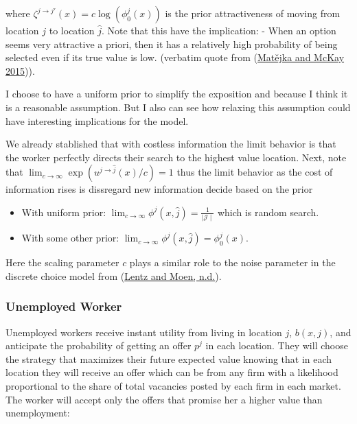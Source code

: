 \documentclass[
  letterpaper,
  DIV=11,
  numbers=noendperiod]{scrartcl}
\providecommand{\tightlist}{%
  \setlength{\itemsep}{0pt}\setlength{\parskip}{0pt}}\usepackage{longtable,booktabs,array}
\begin{document}
where \(\zeta^{j \to j'}(x) = c \log(\phi^j_0(x))\) is the prior
attractiveness of moving from location \(j\) to location \(\hat{j}\).
Note that this have the implication: - When an option seems very
attractive a priori, then it has a relatively high probability of being
selected even if its true value is low. (verbatim quote from
(\protect\hyperlink{ref-matejkaRationalInattentionDiscrete2015}{Matějka
and McKay 2015})).

I choose to have a uniform prior to simplify the exposition and because
I think it is a reasonable assumption. But I also can see how relaxing
this assumption could have interesting implications for the model.

We already stablished that with costless information the limit behavior
is that the worker perfectly directs their search to the highest value
location. Next, note that
\(\lim_{c \to \infty} \exp(u^{j\to \hat{j}}(x) / c) = 1\) thus the limit
behavior as the cost of information rises is dissregard new information
decide based on the prior

\begin{itemize}
\tightlist
\item
  With uniform prior:
  \(\lim_{c \to \infty} \phi^j(x,\hat{j}) = \frac{1}{\mid \mathcal{J} \mid}\)
  which is random search.
\item
  With some other prior:
  \(\lim_{c \to \infty} \phi^j(x,\hat{j}) = \phi^j_0(x)\).
\end{itemize}

Here the scaling parameter \(c\) plays a similar role to the noise
parameter in the discrete choice model from
(\protect\hyperlink{ref-lentzCompetitiveRandomSearch}{Lentz and Moen,
n.d.}).

\hypertarget{unemployed-worker}{%
\subsubsection{Unemployed Worker}\label{unemployed-worker}}

Unemployed workers receive instant utility from living in location
\(j\), \(b(x,j)\), and anticipate the probability of getting an offer
\(p^j\) in each location. They will choose the strategy that maximizes
their future expected value knowing that in each location they will
receive an offer which can be from any firm with a likelihood
proportional to the share of total vacancies posted by each firm in each
market. The worker will accept only the offers that promise her a higher
value than unemployment:
\end{document}
